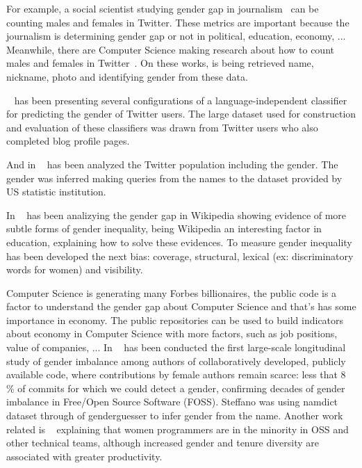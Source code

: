 \documentclass[a4paper]{article}
\begin{document}
For example, a social scientist studying gender gap in
journalism~\cite{alvarez2012journalism} can be counting males and
females in Twitter. These metrics are important because the journalism
is determining gender gap or not in political, education, economy,
... Meanwhile, there are Computer Science making research about how to
count males and females in Twitter~\cite{burger2011discriminating}. On
these works, is being retrieved name, nickname, photo and identifying
gender from these data.

~\cite{burger2011discriminating} has been presenting several
configurations of a language-independent classifier for predicting the
gender of Twitter users. The large dataset used for construction and
evaluation of these classifiers was drawn from Twitter users who also
completed blog profile pages.

And in ~\cite{mislove2011understanding} has been analyzed the Twitter
population including the gender. The gender was inferred making queries
from the names to the dataset provided by US statistic institution.

In ~\cite{wagner2015s} has been analizying the gender gap in Wikipedia
showing evidence of more subtle forms of gender inequality, being
Wikipedia an interesting factor in education, explaining how to solve
these evidences. To measure gender inequality has been developed the
next bias: coverage, structural, lexical (ex: discriminatory words
for women) and visibility.

Computer Science is generating many Forbes billionaires, the public
code is a factor to understand the gender gap about Computer Science
and that's has some importance in economy. The public repositories can
be used to build indicators about economy in Computer Science with
more factors, such as job positions, value of companies, ... In
~\cite{zacchiroli2020gender} has been conducted the first large-scale
longitudinal study of gender imbalance among authors of
collaboratively developed, publicly available code, where
contributions by female authors remain scarce: less that 8 \% of
commits for which we could detect a gender, confirming decades of
gender imbalance in Free/Open Source Software (FOSS). Steffano was
using namdict dataset through of genderguesser to infer gender from
the name. Another work related is ~\cite{vasilescu2015gender}
explaining that women programmers are in the minority in OSS and other
technical teams, although increased gender and tenure diversity are
associated with greater productivity.
\end{document}
